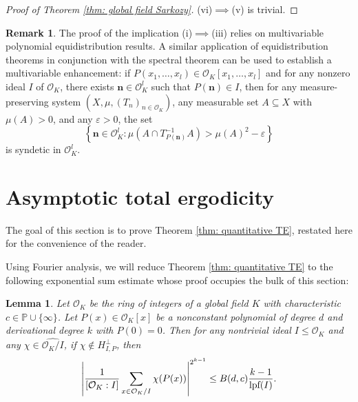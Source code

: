 \documentclass{amsart}
\newtheorem{lemma}[theorem]{Lemma}
\theoremstyle{definition}
\newtheorem{remark}[theorem]{Remark}
\numberwithin{equation}{section}
\renewcommand{\P}{\mathbb{P}}
\newcommand{\mO}{\mathcal{O}}
\newcommand{\eps}{\varepsilon}
\newcommand{\lpf}{\normalfont\text{lpf}}
\renewcommand{\hat}{\widehat}
\begin{document}
\begin{proof}[Proof of Theorem \ref{thm: global field Sarkozy}]
    (vi)$\implies$(v) is trivial.
\end{proof}

\begin{remark}
    The proof of the implication (i)$\implies$(iii) relies on multivariable polynomial equidistribution results.
    A similar application of equidistribution theorems in conjunction with the spectral theorem can be used to establish a multivariable enhancement: if $P(x_1, \ldots, x_l) \in \mO_K[x_1, \ldots, x_l]$ and for any nonzero ideal $I$ of $\mO_K$, there exists $\bm{n} \in \mO_K^l$ such that $P(\bm{n}) \in I$, then for any measure-preserving system $(X, \mu, (T_n)_{n \in \mO_K})$, any measurable set $A \subseteq X$ with $\mu(A) > 0$, and any $\eps > 0$, the set
    \begin{equation*}
        \left\{ \bm{n} \in \mO_K^l : \mu \left( A \cap T_{P(\bm{n})}^{-1}A \right) > \mu(A)^2 - \eps \right\}
    \end{equation*}
    is syndetic in $\mO_K^l$.
\end{remark}


\section{Asymptotic total ergodicity} \label{sec:ATE proof}

The goal of this section is to prove Theorem \ref{thm: quantitative TE}, restated here for the convenience of the reader.

\QuantitativeTE*

Using Fourier analysis, we will reduce Theorem \ref{thm: quantitative TE} to the following exponential sum estimate whose proof occupies the bulk of this section:

\begin{lemma} \label{lem: character bound}
    Let $\mO_K$ be the ring of integers of a global field $K$ with characteristic $c \in \P \cup \{\infty\}$.
	Let $P(x) \in \mO_K[x]$ be a nonconstant polynomial of degree $d$ and derivational degree $k$ with $P(0) = 0$.
	Then for any nontrivial ideal $I \le \mO_K$ and any $\chi \in \hat{\mO_K/I}$, if $\chi \notin H_{I,P}^{\perp}$, then
	\begin{equation*}
		\left| \frac{1}{[\mO_K:I]} \sum_{x \in \mO_K/I}{\chi(P(x))} \right|^{2^{k-1}} \le B(d,c) \frac{k-1}{\lpf(I)}.
	\end{equation*}
\end{lemma}
\end{document}
